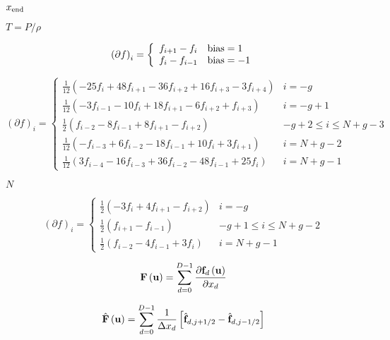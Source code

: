 \documentclass{article}
\begin{document}
$x_{\rm end}$
\pagebreak

$ T = P/\rho$
\pagebreak

\begin{equation} \left(\partial f\right)_i = \left\{ \begin{array}{ll} f_{i+1} - f_i & {\rm bias} = 1 \\ f_i - f_{i-1} & {\rm bias} = -1 \end{array}\right. \end{equation}
\pagebreak

\begin{equation} \left(\partial f\right)_i = \left\{ \begin{array}{ll} \frac{1}{12}\left(-25f_i+48f_{i+1}-36f_{i+2}+16f_{i+3}-3f_{i+4}\right) & i=-g \\ \frac{1}{12}\left(-3f_{i-1}-10f_i+18f_{i+1}-6f_{i+2}+f_{i+3}\right) & i = -g+1 \\ \frac{1}{2}\left( f_{i-2}-8f_{i-1}+8f_{i+1}-f_{i+2} \right) & -g+2 \leq i \leq N+g-3 \\ \frac{1}{12}\left( -f_{i-3}+6f_{i-2}-18f_{i-1}+10f_i+3f_{i+1}\right) & i = N+g-2 \\ \frac{1}{12}\left( 3f_{i-4}-16f_{i-3}+36f_{i-2}-48f_{i-1}+25f_i \right) & i = N+g-1 \end{array}\right. \end{equation}
\pagebreak

$N$
\pagebreak

\begin{equation} \left(\partial f\right)_i = \left\{ \begin{array}{ll} \frac{1}{2}\left(-3f_i+4f_{i+1}-f_{i+2}\right) & i = -g \\ \frac{1}{2}\left( f_{i+1} - f_{i-1} \right) & -g+1 \leq i \leq N+g-2 \\ \frac{1}{2}\left( f_{i-2} -4f_{i-1}+3f_i \right) & i = N+g-1 \end{array}\right. \end{equation}
\pagebreak

\begin{equation} {\bf F} \left({\bf u}\right) = \sum_{d=0}^{D-1} \frac {\partial {\bf f}_d\left({\bf u}\right)} {\partial x_d} \end{equation}
\pagebreak

\begin{equation} \hat{\bf F} \left({\bf u}\right) = \sum_{d=0}^{D-1} \frac {1} {\Delta x_d} \left[ \hat{\bf f}_{d,j+1/2} - \hat{\bf f}_{d,j-1/2} \right] \end{equation}
\pagebreak
\end{document}
